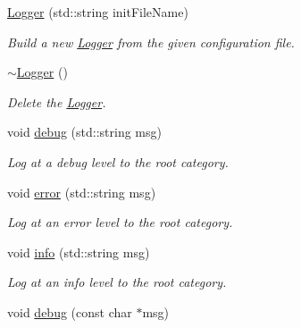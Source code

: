 \begin{DoxyCompactItemize}
\item 
\hypertarget{classLogger_adb1272641185c60ded6e973d7271c960}{\hyperlink{classLogger_adb1272641185c60ded6e973d7271c960}{Logger} (std\-::string init\-File\-Name)}\label{classLogger_adb1272641185c60ded6e973d7271c960}

\begin{DoxyCompactList}\small\item\em Build a new \hyperlink{classLogger}{Logger} from the given configuration file. \end{DoxyCompactList}\item 
\hypertarget{classLogger_acb668a9e186a25fbaad2e4af6d1ed00a}{\hyperlink{classLogger_acb668a9e186a25fbaad2e4af6d1ed00a}{$\sim$\-Logger} ()}\label{classLogger_acb668a9e186a25fbaad2e4af6d1ed00a}

\begin{DoxyCompactList}\small\item\em Delete the \hyperlink{classLogger}{Logger}. \end{DoxyCompactList}\item 
\hypertarget{classLogger_af1bdbe3c7f0afa9004071e870cf59db3}{void \hyperlink{classLogger_af1bdbe3c7f0afa9004071e870cf59db3}{debug} (std\-::string msg)}\label{classLogger_af1bdbe3c7f0afa9004071e870cf59db3}

\begin{DoxyCompactList}\small\item\em Log at a debug level to the root category. \end{DoxyCompactList}\item 
\hypertarget{classLogger_a5a5ae8bd2e452e9c844939fcaf5af790}{void \hyperlink{classLogger_a5a5ae8bd2e452e9c844939fcaf5af790}{error} (std\-::string msg)}\label{classLogger_a5a5ae8bd2e452e9c844939fcaf5af790}

\begin{DoxyCompactList}\small\item\em Log at an error level to the root category. \end{DoxyCompactList}\item 
\hypertarget{classLogger_aba0bf8a3ebff47c016a5732eda9fa5e6}{void \hyperlink{classLogger_aba0bf8a3ebff47c016a5732eda9fa5e6}{info} (std\-::string msg)}\label{classLogger_aba0bf8a3ebff47c016a5732eda9fa5e6}

\begin{DoxyCompactList}\small\item\em Log at an info level to the root category. \end{DoxyCompactList}\item 
\hypertarget{classLogger_a8e5bf8bea9490c70a1eebb28c042bdb2}{void \hyperlink{classLogger_a8e5bf8bea9490c70a1eebb28c042bdb2}{debug} (const char $\ast$msg)}\label{classLogger_a8e5bf8bea9490c70a1eebb28c042bdb2}


\end{DoxyCompactItemize}
